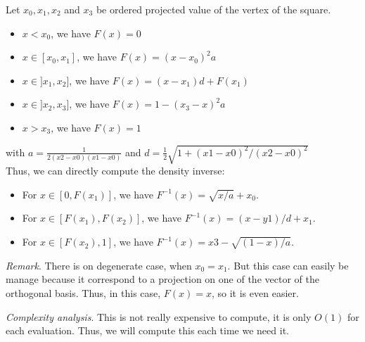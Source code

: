 \documentclass{classeENS}
\begin{document}
    Let $x_0,x_1,x_2$ and $x_3$ be ordered projected value of the vertex of the square.
    \begin{itemize}
        \item $x < x_0$, we have $F(x) = 0$
        \item $x \in [x_0,x_1]$, we have  $F(x) = (x-x_0)^2a$
        \item $x \in ]x_1,x_2]$, we have  $F(x) = (x-x_1)d + F(x_1)$
        \item $x \in ]x_2,x_3]$, we have  $F(x) = 1 - (x_3-x)^2a$
        \item $x > x_3$, we have $F(x) = 1$
    \end{itemize}
    with $a =  \frac{1}{2(x2-x0)(x1-x0)}$ and $d = \frac{1}{2}\sqrt{1 + (x1-x0)^2/(x2-x0)^2}$ \\
    Thus, we can directly compute the density inverse:
    \begin{itemize}
        \item For $x \in [0,F(x_1)]$, we have $F^{-1}(x) = \sqrt{x/a} + x_0$.
        \item For $x \in [F(x_1),F(x_2)]$, we have $F^{-1}(x) = (x-y1)/d + x_1$.
        \item For $x \in [F(x_2),1]$, we have $F^{-1}(x) = x3 - \sqrt{(1-x)/a}$.
    \end{itemize}
    
\> \textit{Remark}. There is on degenerate case, when $x_0=x_1$. But this case can easily 
    be manage because it correspond to a projection on one of the vector of the orthogonal
    basis. Thus, in this case, $F(x) = x$, so it is even easier.
    
\> \textit{Complexity analysis}. This is not really expensive to compute, it is only $O(1)$     for each evaluation. Thus, we will compute this each time we need it.
\end{document}
